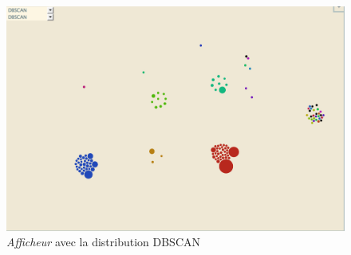 \documentclass[12pt]{report}
\begin{document}
\begin{spacing}{1.2}
\begin{figure}[h]
\begin{center}
	\includegraphics[scale=0.6]{img/DBSCAN-Ex.jpg}
\end{center}
\caption{\textit{Afficheur} avec la distribution DBSCAN}
\end{figure}

\end{spacing}
\end{document}
